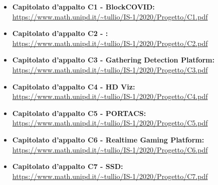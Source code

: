 \begin{itemize}
\item \textbf {Capitolato d'appalto C1 - BlockCOVID:}\\
\url{https://www.math.unipd.it/~tullio/IS-1/2020/Progetto/C1.pdf}
\item \textbf {Capitolato d'appalto C2 - \NomeProgetto:}\\
\url{https://www.math.unipd.it/~tullio/IS-1/2020/Progetto/C2.pdf}
\item \textbf {Capitolato d'appalto C3 - Gathering Detection Platform:}\\
\url{https://www.math.unipd.it/~tullio/IS-1/2020/Progetto/C3.pdf}
\item \textbf {Capitolato d'appalto C4 - HD Viz:}\\
\url{https://www.math.unipd.it/~tullio/IS-1/2020/Progetto/C4.pdf}
\item \textbf {Capitolato d'appalto C5 - PORTACS:}\\
\url{https://www.math.unipd.it/~tullio/IS-1/2020/Progetto/C5.pdf}
\item \textbf {Capitolato d'appalto C6 - Realtime Gaming Platform:}\\
\url{https://www.math.unipd.it/~tullio/IS-1/2020/Progetto/C6.pdf}
\item \textbf {Capitolato d'appalto C7 - SSD:}\\
\url{https://www.math.unipd.it/~tullio/IS-1/2020/Progetto/C7.pdf}

\end{itemize}